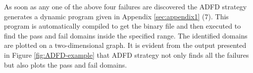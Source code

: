 As soon as any one of the above four failures are discovered the ADFD strategy generates a dynamic program given in Appendix \ref{sec:appendix1} (7). This program is automatically compiled to get the binary file and then executed to find the pass and fail domains inside the specified range. The identified domains are plotted on a two-dimensional graph. It is evident from the output presented in Figure \ref{fig:ADFD-example} that ADFD strategy not only finds all the failures but also plots the pass and fail domains.

